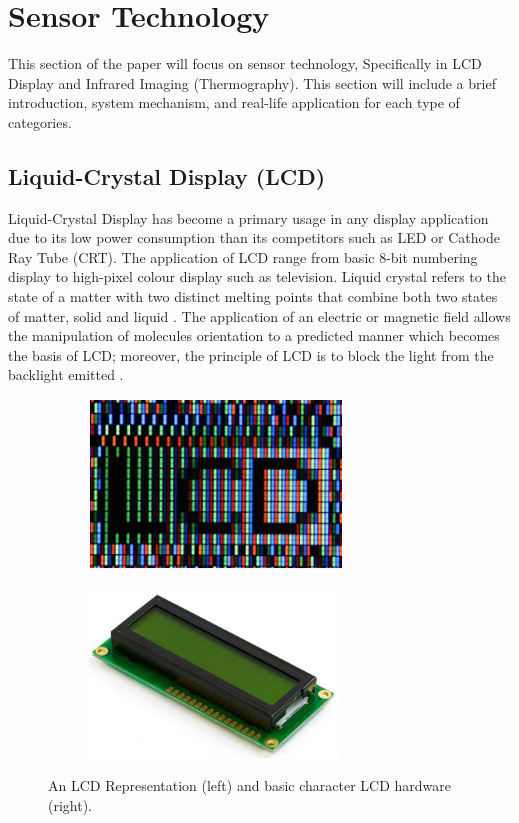 \justifying
\noindent

\section{Sensor Technology}
This section of the paper will focus on sensor technology, Specifically in LCD Display and Infrared Imaging (Thermography). This section will include a brief introduction, system mechanism, and real-life application for each type of categories. \\

\subsection{Liquid-Crystal Display (LCD)}
\noindent Liquid-Crystal Display has become a primary usage in any display application due to its low power consumption than its competitors such as LED or Cathode Ray Tube (CRT). The application of LCD range from basic 8-bit numbering display to high-pixel colour display such as television. Liquid crystal refers to the state of a matter with two distinct melting points that combine both two states of matter, solid and liquid \cite{AnonymousLCDApplications}\cite{Gurski2005DisplayOverview}. The application of an electric or magnetic field allows the manipulation of molecules orientation to a predicted manner which becomes the basis of LCD; moreover, the principle of LCD is to block the light from the backlight emitted \cite{Gurski2005DisplayOverview}.\\

\begin{figure}[!ht]
\centering
%    
  \begin{subfigure}[b]{0.4\textwidth}
    \includegraphics[height=4.5cm]{Figures/LCD_general.PNG}
  \end{subfigure}
  \begin{subfigure}[b]{0.4\textwidth}
    \includegraphics[height=4.5cm]{Figures/LCD_BASIC.jpg}
  \end{subfigure}
%  
  \caption{An LCD Representation \cite{Gurski2005DisplayOverview} (left) and basic character LCD hardware \cite{AnonymousBasicSystems} (right).}
    \label{fig:basic lcd}
\end{figure}

